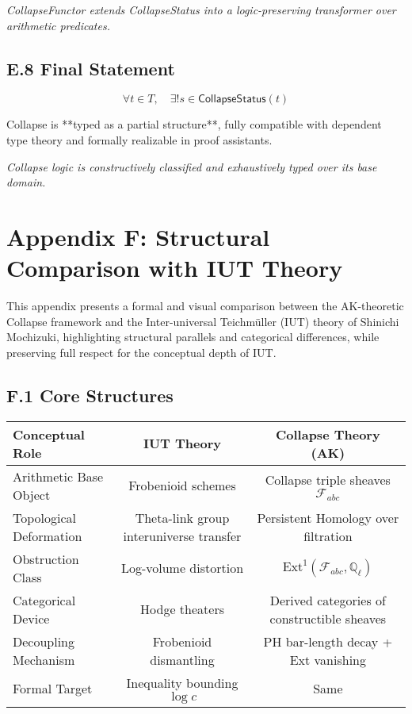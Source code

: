 \documentclass[11pt]{article}
\begin{document}
\begin{center}
\textit{CollapseFunctor extends CollapseStatus into a logic-preserving transformer over arithmetic predicates.}
\end{center}



\subsection*{E.8 Final Statement}

\[
\boxed{
\forall t \in T,\quad \exists! s \in \mathsf{CollapseStatus}(t)
}
\]

Collapse is **typed as a partial structure**, fully compatible with dependent type theory and formally realizable in proof assistants.

\begin{center}
\textit{Collapse logic is constructively classified and exhaustively typed over its base domain.}
\end{center}



\section*{Appendix F: Structural Comparison with IUT Theory}

This appendix presents a formal and visual comparison between the AK-theoretic Collapse framework  
and the Inter-universal Teichmüller (IUT) theory of Shinichi Mochizuki, highlighting structural parallels  
and categorical differences, while preserving full respect for the conceptual depth of IUT.

\subsection*{F.1 Core Structures}

\begin{tabular}{|l|c|c|}
\hline
\textbf{Conceptual Role} & \textbf{IUT Theory} & \textbf{Collapse Theory (AK)} \\
\hline
Arithmetic Base Object & Frobenioid schemes & Collapse triple sheaves \( \mathcal{F}_{abc} \) \\
Topological Deformation & Theta-link group interuniverse transfer & Persistent Homology over filtration \\
Obstruction Class & Log-volume distortion & \( \mathrm{Ext}^1(\mathcal{F}_{abc}, \mathbb{Q}_\ell) \) \\
Categorical Device & Hodge theaters & Derived categories of constructible sheaves \\
Decoupling Mechanism & Frobenioid dismantling & PH bar-length decay + Ext vanishing \\
Formal Target & Inequality bounding \( \log c \) & Same \\
\hline
\end{tabular}
\end{document}
